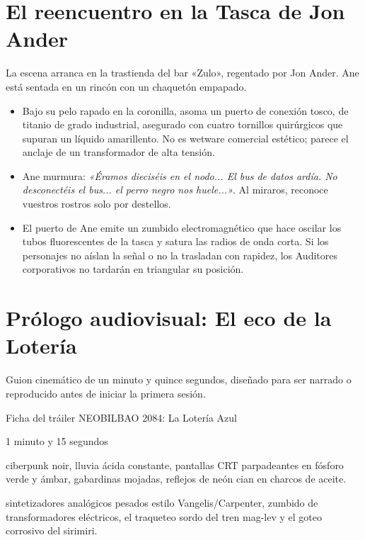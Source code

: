 \section{El reencuentro en la Tasca de Jon Ander}


La escena arranca en la trastienda del bar «Zulo», regentado por Jon Ander. Ane está sentada en un rincón con un chaquetón empapado. 

\begin{itemize}
  \item {} Bajo su pelo rapado en la coronilla, asoma un puerto de conexión tosco, de titanio de grado industrial, asegurado con cuatro tornillos quirúrgicos que supuran un líquido amarillento. No es wetware comercial estético; parece el anclaje de un transformador de alta tensión.
  \item {} Ane murmura: \emph{«Éramos dieciséis en el nodo... El bus de datos ardía. No desconectéis el bus... el perro negro nos huele...»}. Al miraros, reconoce vuestros rostros solo por destellos.
  \item {} El puerto de Ane emite un zumbido electromagnético que hace oscilar los tubos fluorescentes de la tasca y satura las radios de onda corta. Si los personajes no aíslan la señal o no la trasladan con rapidez, los Auditores corporativos no tardarán en triangular su posición.
\end{itemize}

\section{Prólogo audiovisual: El eco de la Lotería}

Guion cinemático de un minuto y quince segundos, diseñado para ser narrado o reproducido antes de iniciar la primera sesión.

\begin{CajaCinematica}{Ficha del tráiler}
 NEOBILBAO 2084: La Lotería Azul\par
{} 1 minuto y 15 segundos\par
{} ciberpunk noir, lluvia ácida constante, pantallas CRT parpadeantes en fósforo verde y ámbar, gabardinas mojadas, reflejos de neón cian en charcos de aceite.\par
{} sintetizadores analógicos pesados estilo Vangelis/Carpenter, zumbido de transformadores eléctricos, el traqueteo sordo del tren mag-lev y el goteo corrosivo del sirimiri.
\end{CajaCinematica}

